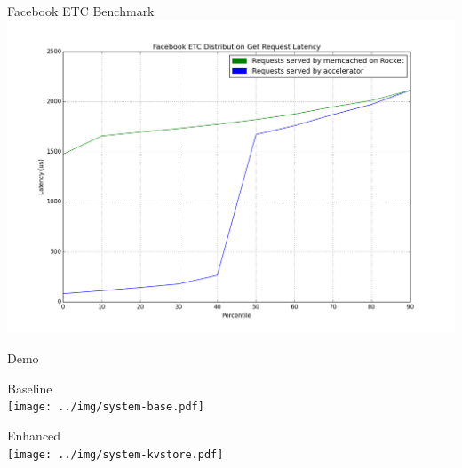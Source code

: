\documentclass{beamer}
\begin{document}
\begin{frame}{Facebook ETC Benchmark}
    \includegraphics[width=\linewidth]{../img/facebook_etc_for_pres.png}
\end{frame}





\begin{frame}{Demo}
\begin{multicols}{2}
\centering
\alert{Baseline} \\[0.5\baselineskip]
\texttt{[image: ../img/system-base.pdf]}

\columnbreak

\centering
\alert{Enhanced} \\[0.5\baselineskip]
\texttt{[image: ../img/system-kvstore.pdf]}
\end{multicols}
\end{frame}
\end{document}
